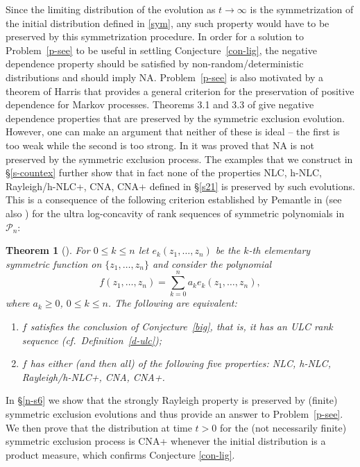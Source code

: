 \documentclass[10pt,reqno]{amsart}
\theoremstyle{plain}
\newtheorem{theorem}{Theorem}[section]
\theoremstyle{definition}
\theoremstyle{remark}
\newcommand{\PP}{\mathcal{P}}
\begin{document}
Since the limiting distribution of the evolution as $t\to\infty$ is the 
symmetrization
of the initial distribution defined in \eqref{sym}, any such property would  
have to be preserved by
this symmetrization procedure. In order for a solution to Problem~\ref{p-see}
to be useful in settling
Conjecture~\ref{con-lig}, the negative dependence property should be 
satisfied  by non-random/deterministic distributions and should
imply NA. Problem~\ref{p-see} is also
motivated by a theorem of Harris \cite[Theorem 2.14]{L0} that provides a 
general criterion for the preservation of positive dependence for Markov 
processes. Theorems 3.1 and 3.3 of \cite{L2} give negative dependence 
properties that are preserved by the symmetric exclusion evolution. However, 
one can make an argument that neither of these is ideal -- the first is too 
weak while 
the second is too strong. In \cite[Theorem 3.2]{L2} it was proved that NA is
not preserved by the symmetric exclusion 
process. The examples that we construct in \S \ref{s-countex}
further show that in fact none of the properties NLC, h-NLC, Rayleigh/h-NLC+, 
CNA, CNA+ defined in \S \ref{s21} is preserved by such evolutions. 
This is a consequence of the 
following criterion established by
Pemantle in \cite[Theorem 2.7]{P} (see also \cite[Proposition 3.6]{W}) for the 
ultra log-concavity of rank sequences of 
symmetric polynomials in $\PP_n$:

\begin{theorem}[\cite{P}]\label{pro-w}
For $0\le k\le n$ let $e_k(z_1,\ldots,z_n)$ be the $k$-th elementary symmetric 
function on $\{z_1,\ldots,z_n\}$ and consider the polynomial
$$f(z_1,\ldots,z_n)=\sum_{k=0}^{n}a_ke_k(z_1,\ldots,z_n),$$
where $a_k\ge 0$, $0\le k\le n$. The following are equivalent:
\begin{enumerate}
\item $f$ satisfies the conclusion of 
Conjecture~\ref{big}, that is, it has an ULC rank sequence 
(cf.~Definition~\ref{d-ulc});
\item $f$ has either (and then all) of the following five properties: NLC, 
h-NLC, Rayleigh/h-NLC+, CNA, CNA+.
\end{enumerate}
\end{theorem}

In \S \ref{n-s6} we show that the strongly Rayleigh 
property is preserved by (finite) symmetric exclusion evolutions  
and thus provide an answer to Problem~\ref{p-see}. 
We then prove that the distribution at time 
$t>0$ for the (not necessarily finite) symmetric exclusion process is 
CNA+ whenever the initial distribution is a product measure, which confirms 
Conjecture \ref{con-lig}.
\end{document}
